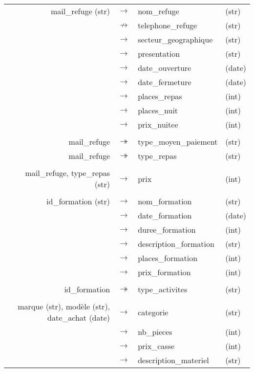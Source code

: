 \documentclass[a4paper, 10pt]{article} %
\begin{document}
\begin{tabular}{rlll}
  mail\_refuge (str)  & $\rightarrow$ & nom\_refuge & (str) \\
               & $\nrightarrow$ & telephone\_refuge & (str) \\
               & $\rightarrow$ & secteur\_geographique & (str) \\
              & $\rightarrow$ & presentation & (str) \\
               & $\rightarrow$ & date\_ouverture & (date) \\
               & $\rightarrow$ & date\_fermeture & (date) \\
               & $\rightarrow$ & places\_repas & (int) \\
              & $\rightarrow$ & places\_nuit & (int) \\
              & $\rightarrow$ & prix\_nuitee & (int) \\
\\
  mail\_refuge & $\twoheadrightarrow$ & type\_moyen\_paiement & (str) \\
  mail\_refuge & $\twoheadrightarrow$ & type\_repas & (str) \\
  \\
  mail\_refuge, type\_repas (str) & $\rightarrow$ & prix & (int) \\
  \\
  id\_formation (str) & $\rightarrow$ & nom\_formation & (str) \\
               & $\rightarrow$ & date\_formation & (date) \\
               & $\rightarrow$ & duree\_formation & (int) \\
               & $\rightarrow$ & description\_formation & (str) \\
               & $\rightarrow$ & places\_formation & (int) \\
               & $\rightarrow$ & prix\_formation & (int) \\
  \\
  id\_formation & $\twoheadrightarrow$ & type\_activites & (str) \\
  \\
  marque (str), modèle (str), date\_achat (date) & $\rightarrow$ & categorie & (str) \\
               & $\rightarrow$ & nb\_pieces & (int) \\
               & $\rightarrow$ & prix\_casse & (int) \\
               & $\rightarrow$ & description\_materiel & (str) \\

\end{tabular}
\end{document}
